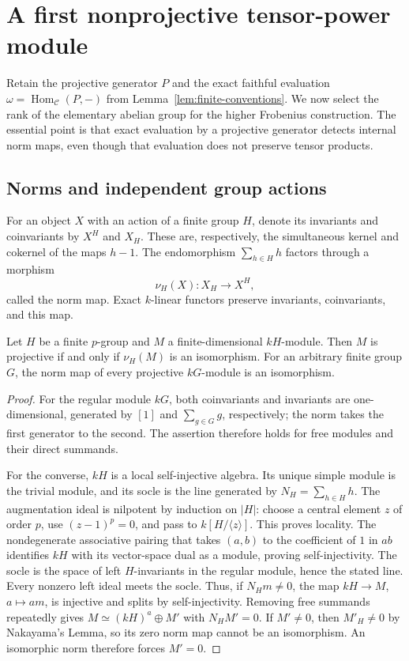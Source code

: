 \section{A first nonprojective tensor-power module}
\label{sec:projectivity}

Retain the projective generator $P$ and the exact faithful evaluation
$\omega=\operatorname{Hom}_{\mathcal C}(P,-)$ from
Lemma~\ref{lem:finite-conventions}. We now select the rank of the elementary
abelian group for the higher Frobenius construction. The essential point is that exact
evaluation by a projective generator detects internal norm maps, even
though that evaluation does not preserve tensor products.

\subsection{Norms and independent group actions}

For an object $X$ with an action of a finite group $H$, denote its
invariants and coinvariants by $X^H$ and $X_H$.  These are, respectively,
the simultaneous kernel and cokernel of the maps $h-1$.  The endomorphism
$\sum_{h\in H}h$ factors through a morphism
\[
 \nu_H(X):X_H\longrightarrow X^H,
\]
called the norm map.  Exact $k$-linear functors preserve invariants,
coinvariants, and this map.

\begin{lemma}\label{lem:norm-projectivity}
Let $H$ be a finite $p$-group and $M$ a finite-dimensional $kH$-module.
Then $M$ is projective if and only if $\nu_H(M)$ is an isomorphism.
For an arbitrary finite group $G$, the norm map of every projective
$kG$-module is an isomorphism.
\end{lemma}

\begin{proof}
For the regular module $kG$, both coinvariants and invariants are
one-dimensional, generated by $[1]$ and $\sum_{g\in G}g$, respectively;
the norm takes the first generator to the second.  The assertion therefore
holds for free modules and their direct summands.

For the converse, $kH$ is a local self-injective algebra.  Its unique
simple module is the trivial module, and its socle is the line generated
by $N_H=\sum_{h\in H}h$.  The augmentation ideal is nilpotent by induction
on $|H|$: choose a central element $z$ of order $p$, use $(z-1)^p=0$,
and pass to $k[H/\langle z\rangle]$.  This proves locality.  The
nondegenerate associative pairing that takes $(a,b)$ to the coefficient
of $1$ in $ab$ identifies $kH$ with its vector-space dual as a module,
proving self-injectivity.  The socle is the space of left $H$-invariants
in the regular module, hence the stated line.
Every nonzero left ideal meets the socle.  Thus, if $N_Hm\ne0$, the map
$kH\to M$, $a\mapsto am$, is injective and splits by self-injectivity.
Removing free summands repeatedly gives $M\simeq(kH)^a\oplus M'$ with
$N_HM'=0$.  If $M'\ne0$, then $M'_H\ne0$ by Nakayama's Lemma, so its
zero norm map cannot be an isomorphism.  An isomorphic norm therefore
forces $M'=0$.
\end{proof}

